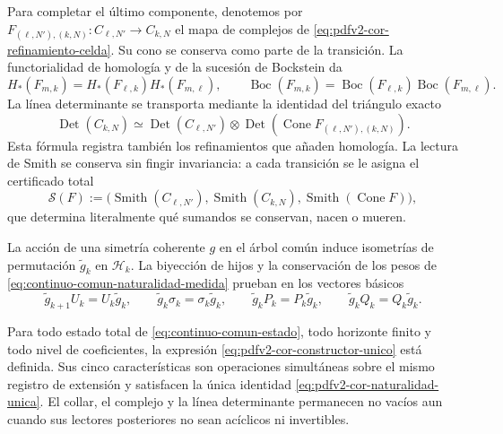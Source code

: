Para completar el último componente, denotemos por
\(F_{(\ell,N'),(k,N)}:C_{\ell,N'}\to C_{k,N}\) el mapa de complejos de
\eqref{eq:pdfv2-cor-refinamiento-celda}. Su cono se conserva como parte de la
transición. La functorialidad de homología y de la sucesión de Bockstein da
\begin{equation}
\label{eq:pdfv2-cor-naturalidad-homologia-bockstein}
 H_*(F_{m,k})=H_*(F_{\ell,k})H_*(F_{m,\ell}),
 \qquad
 \operatorname{Boc}(F_{m,k})
 =\operatorname{Boc}(F_{\ell,k})
  \operatorname{Boc}(F_{m,\ell}).
\end{equation}
La línea determinante se transporta mediante la identidad del triángulo
exacto
\begin{equation}
\label{eq:pdfv2-cor-naturalidad-determinante}
 \operatorname{Det}(C_{k,N})
 \simeq
 \operatorname{Det}(C_{\ell,N'})\otimes
 \operatorname{Det}\!\left(\operatorname{Cone}
 F_{(\ell,N'),(k,N)}\right).
\end{equation}
Esta fórmula registra también los refinamientos que añaden homología. La
lectura de Smith se conserva sin fingir invariancia: a cada transición se le
asigna el certificado total
\begin{equation}
\label{eq:pdfv2-cor-transicion-smith}
 \mathcal S(F):=
 \bigl(\operatorname{Smith}(C_{\ell,N'}),
       \operatorname{Smith}(C_{k,N}),
       \operatorname{Smith}(\operatorname{Cone}F)\bigr),
\end{equation}
que determina literalmente qué sumandos se conservan, nacen o mueren.

La acción de una simetría coherente \(g\) en el árbol común induce
isometrías de permutación \(\widetilde g_k\) en
\(\mathscr H_k\). La biyección de hijos y la conservación de los pesos de
\eqref{eq:continuo-comun-naturalidad-medida} prueban en los vectores básicos
\begin{equation}
\label{eq:pdfv2-cor-naturalidad-transporte-hojas}
 \widetilde g_{k+1}U_k=U_k\widetilde g_k,
 \qquad
 \widetilde g_k\sigma_k=\sigma_k\widetilde g_k,
 \qquad
 \widetilde g_kP_k=P_k\widetilde g_k,
 \qquad
 \widetilde g_kQ_k=Q_k\widetilde g_k.
\end{equation}

\begin{theorem}
\label{thm:pdfv2-cor-totalidad-naturalidad}
Para todo estado total de \eqref{eq:continuo-comun-estado}, todo horizonte
finito y todo nivel de coeficientes, la expresión
\eqref{eq:pdfv2-cor-constructor-unico} está definida. Sus cinco
características son operaciones simultáneas sobre el mismo registro de
extensión y satisfacen la única identidad
\eqref{eq:pdfv2-cor-naturalidad-unica}. El collar, el complejo y la línea
determinante permanecen no vacíos aun cuando sus lectores posteriores no
sean acíclicos ni invertibles.
\end{theorem}

